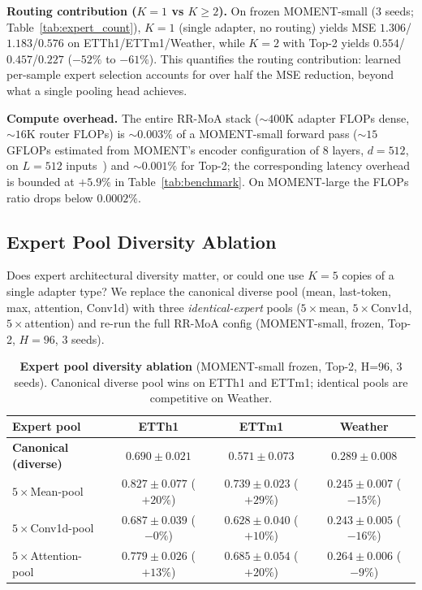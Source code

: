 \documentclass{article}
\begin{document}
\textbf{Routing contribution ($K{=}1$ vs $K{\geq}2$).} On frozen MOMENT-small (3 seeds; Table~\ref{tab:expert_count}), $K{=}1$ (single adapter, no routing) yields MSE $1.306$/$1.183$/$0.576$ on ETTh1/ETTm1/Weather, while $K{=}2$ with Top-2 yields $0.554$/$0.457$/$0.227$ ($-52\%$ to $-61\%$). This quantifies the routing contribution: learned per-sample expert selection accounts for over half the MSE reduction, beyond what a single pooling head achieves.

\textbf{Compute overhead.} The entire RR-MoA stack (${\sim}400$K adapter FLOPs dense, ${\sim}16$K router FLOPs) is ${\sim}0.003\%$ of a MOMENT-small forward pass (${\sim}15$ GFLOPs estimated from MOMENT's encoder configuration of 8 layers, $d{=}512$, on $L{=}512$ inputs~\citep{goswami2024moment}) and ${\sim}0.001\%$ for Top-2; the corresponding latency overhead is bounded at $+5.9\%$ in Table~\ref{tab:benchmark}. On MOMENT-large the FLOPs ratio drops below $0.0002\%$.

\subsection{Expert Pool Diversity Ablation}
\label{app:diversity}

Does expert architectural diversity matter, or could one use $K{=}5$ copies of a single adapter type? We replace the canonical diverse pool (mean, last-token, max, attention, Conv1d) with three \emph{identical-expert} pools ($5{\times}$mean, $5{\times}$Conv1d, $5{\times}$attention) and re-run the full RR-MoA config (MOMENT-small, frozen, Top-2, $H{=}96$, 3 seeds).

\begin{table}[!htbp]
\centering
\caption{\textbf{Expert pool diversity ablation} (MOMENT-small frozen, Top-2, H=96, 3 seeds). Canonical diverse pool wins on ETTh1 and ETTm1; identical pools are competitive on Weather.}
\label{tab:diversity}
\small
\begin{tabular}{@{}lccc@{}}
\toprule
Expert pool & ETTh1 & ETTm1 & Weather \\
\midrule
\textbf{Canonical (diverse)} & $\mathbf{0.690 \pm 0.021}$ & $\mathbf{0.571 \pm 0.073}$ & $0.289 \pm 0.008$ \\
$5{\times}$Mean-pool       & $0.827 \pm 0.077$ {\scriptsize($+20\%$)} & $0.739 \pm 0.023$ {\scriptsize($+29\%$)} & $\mathbf{0.245 \pm 0.007}$ {\scriptsize($-15\%$)} \\
$5{\times}$Conv1d-pool     & $0.687 \pm 0.039$ {\scriptsize($-0\%$)}  & $0.628 \pm 0.040$ {\scriptsize($+10\%$)} & $0.243 \pm 0.005$ {\scriptsize($-16\%$)} \\
$5{\times}$Attention-pool  & $0.779 \pm 0.026$ {\scriptsize($+13\%$)} & $0.685 \pm 0.054$ {\scriptsize($+20\%$)} & $0.264 \pm 0.006$ {\scriptsize($-9\%$)}  \\
\bottomrule
\end{tabular}
\end{table}
\end{document}

